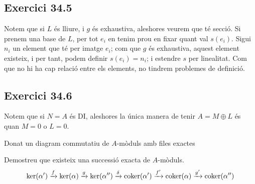 \documentclass[11pt, a4paper]{article}
\begin{document}
\subsection{Exercici 34.5}
Notem que si $L$ és lliure, i $g$ és exhaustiva, aleshores veurem que té secció. Si prenem una base de $L$, per tot $e_i$ en tenim prou en fixar quant val $s(e_i)$. Sigui $n_i$ un element que té per imatge $e_i$; com que $g$ és exhaustiva, aquest element existeix, i per tant, podem definir $s(e_i)=n_i$; i estendre $s$ per linealitat. Com que no hi ha cap relació entre els elements, no tindrem problemes de definició.
\subsection{Exercici 34.6}
Notem que si $N=A$ és DI, aleshores la única manera de tenir $A=M\oplus L$ és quan $M=0$ o $L=0$.
\newpage
\begin{tcolorbox}[title=\section{Exercici 35}(Lema de la Serp)]
Donat un diagram commutatiu de $A$-mòduls amb files exactes
\begin{center}
\end{center}
Demostreu que existeix una successió exacta de $A$-mòduls.
\[
    \ker(\alpha')\xrightarrow{f}\ker(\alpha)\xrightarrow{g}\ker(\alpha'')\xrightarrow{\delta}\operatorname*{coker}(\alpha')\xrightarrow{f'}\operatorname*{coker}(\alpha)\xrightarrow{g'}\operatorname*{coker}(\alpha'')
\]
\end{tcolorbox}
\end{document}
